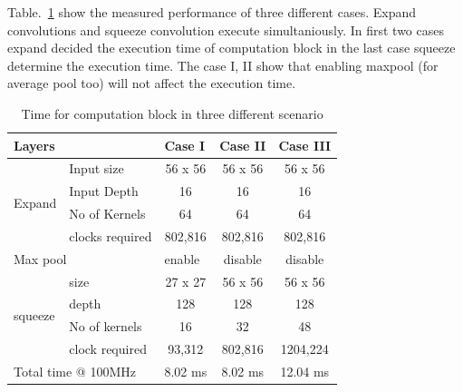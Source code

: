 \documentclass[conference]{IEEEtran}
\begin{document}
Table.~\ref{tab2} show the measured performance of three different cases. Expand convolutions and squeeze convolution execute simultaniously. In first two cases expand decided the execution time of computation block in the last case squeeze determine the execution time. The case I, II show that enabling maxpool (for average pool too) will not affect the execution time.


\begin{table}[htbp]
\caption{Time for computation block in three different scenario}
\begin{tabular}{|l|l|c|c|c|}
\hline
\multicolumn{2}{|l|}{Layers}               & \multicolumn{1}{l|}{Case I}  & Case II & Case III \\ \hline
\multirow{4}{*}{Expand}  & Input size      & 56 x 56                      & 56 x 56 & 56 x 56  \\ \cline{2-5} 
                         & Input Depth     & 16                           & 16      & 16       \\ \cline{2-5} 
                         & No of Kernels   & 64                           & 64      & 64       \\ \cline{2-5} 
                         & clocks required & 802,816                      & 802,816 & 802,816  \\ \hline
\multicolumn{2}{|l|}{Max pool}             & \multicolumn{1}{l|}{enable}  & disable & disable  \\ \hline
\multirow{4}{*}{squeeze} & size            & 27 x 27                      & 56 x 56 & 56 x 56  \\ \cline{2-5} 
                         & depth           & 128                          & 128     & 128      \\ \cline{2-5} 
                         & No of kernels   & 16                           & 32      & 48       \\ \cline{2-5} 
                         & clock required  & 93,312                       & 802,816 & 1204,224 \\ \hline
\multicolumn{2}{|l|}{Total time @ 100MHz}  & \multicolumn{1}{l|}{8.02 ms} & 8.02 ms & 12.04 ms \\ \hline
\end{tabular}
  \label{tab2}
\end{table}
\end{document}
